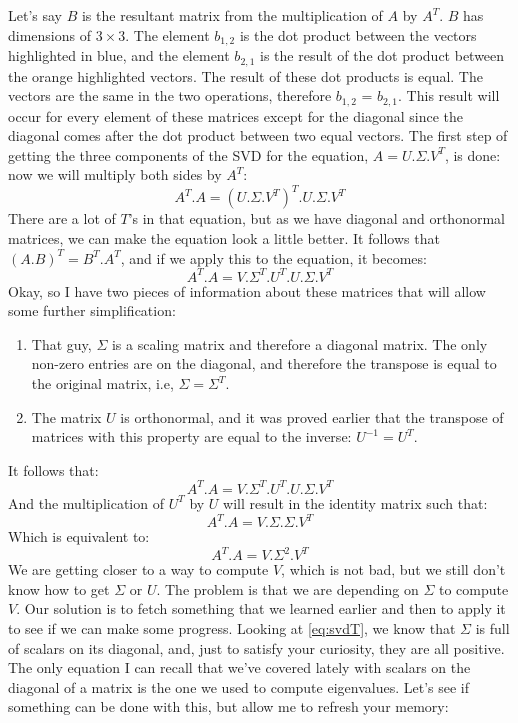 \documentclass[600paper, 11pt,twoside,openany]{kdp}
\begin{document}
\indent Let’s say $B$ is the resultant matrix from the multiplication of $A$ by $A^T$. $B$ has dimensions of $3 \times 3$. The element $b_{1,2}$ is the dot product between the vectors highlighted in blue, and the element $b_{2,1}$ is the result of the dot product between the orange highlighted vectors. The result of these dot products is equal. The vectors are the same in the two operations, therefore $b_{1,2}$ = $b_{2,1}$. This result will occur for every element of these matrices except for the diagonal since the diagonal comes after the dot product between two equal vectors. The first step of getting the three components of the SVD for the equation, $A = U.\Sigma.V^T$, is done: now we will multiply both sides by $A^T$:
\[A^T.A = (U.\Sigma.V^T)^T.U.\Sigma.V^T\]
\indent There are a lot of $T’$s in that equation, but as we have diagonal and orthonormal matrices, we can make the equation look a little better. It follows that $(A.B)^T = B^T.A^T$, and if we apply this to the equation, it becomes:
\[A^T.A = V.\Sigma^T.U^T.U.\Sigma.V^T\]
\indent Okay, so I have two pieces of information about these matrices that will allow some further simplification:
\begin{tcolorbox}
\begin{enumerate}
\item That guy, $\Sigma$ is a scaling matrix and therefore a diagonal matrix. The only non-zero entries are on the diagonal, and therefore the transpose is equal to the original matrix, i.e, $\Sigma = \Sigma^T$.
\item The matrix $U$ is orthonormal, and it was proved earlier that the transpose of matrices with this property are equal to the inverse: $U^{-1} = U^T$.
\end{enumerate}
\end{tcolorbox}
\indent It follows that:
\[A^T.A = V.\Sigma^T.U^T.U.\Sigma.V^T\]
\indent And the multiplication of $U^T$ by $U$ will result in the identity matrix such that:
\[ A^T.A = V.\Sigma.\Sigma.V^T\]
\indent Which is equivalent to:
\begin{equation}\label{eq:svdT}
A^T.A = V.\Sigma^2.V^T
\end{equation}
\indent We are getting closer to a way to compute $V$, which is not bad, but we still don’t know how to get $\Sigma$ or $U$. The problem is that we are depending on $\Sigma$ to compute $V$. Our solution is to fetch something that we learned earlier and then to apply it to see if we can make some progress. Looking at \ref{eq:svdT}, we know that  $\Sigma$ is full of scalars on its diagonal, and, just to satisfy your curiosity, they are all positive. The only equation I can recall that we’ve covered lately with scalars on the diagonal of a matrix is the one we used to compute eigenvalues. Let’s see if something can be done with this, but allow me to refresh your memory:
\end{document}
